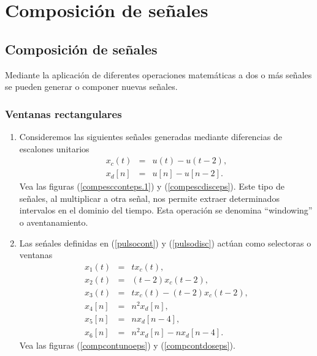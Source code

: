 \chapter{Composici\'{o}n de se\~{n}ales}

\section{Composici\'{o}n de se\~{n}ales}

Mediante la aplicaci\'{o}n de diferentes operaciones matem\'{a}ticas a
dos o m\'{a}s se\~{n}ales se pueden generar o componer nuevas se\~{n}ales.

\subsection{Ventanas rectangulares}

\begin{enumerate}
	\item Consideremos las siguientes se\~{n}ales generadas mediante
	diferencias de escalones unitarios
	\begin{eqnarray}
		x_{c}(t)        &=&     u(t) - u(t-2),                          \label{pulsocont}\\
		x_{d}[n]        &=&     u[n] - u[n-2].                          \label{pulsodisc}
	\end{eqnarray}
	Vea las figuras (\ref{compescconteps.1}) y (\ref{compescdisceps}).
	Este tipo de se\~{n}ales, al multiplicar a otra se\~{n}al, nos permite
	extraer determinados intervalos en el dominio del tiempo. Esta
	operaci\'{o}n se denomina ``windowing'' o aventanamiento.
	
	\item Las se\'{n}ales definidas en (\ref{pulsocont}) y
	(\ref{pulsodisc}) act\'{u}an como selectoras o ventanas
	\begin{eqnarray}
		x_{1}( t)       &=& t x_{c}(t),                                \\
		x_{2}( t)       &=& (t - 2) x_{c}(t - 2),                      \\
		x_{3}( t)       &=& t x_{c}(t) - (t - 2) x_{c}(t - 2),          \\
		x_{4}[ n]       &=& n^{2} x_{d}[n],                             \\
		x_{5}[ n]       &=& n x_{d}[n-4],                               \\ 
		x_{6}[ n]       &=& n^{2} x_{d}[n] - n x_{d}[n-4].
	\end{eqnarray}
	Vea las figuras (\ref{compcontunoeps}) y (\ref{compcontdoseps}). 
\end{enumerate}

